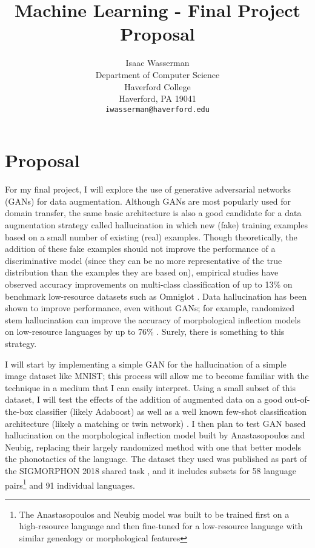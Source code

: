 \documentclass{article}
\title{Machine Learning - Final Project Proposal}
\author{%
  Isaac Wasserman\\
  Department of Computer Science\\
  Haverford College\\
  Haverford, PA 19041\\
  \texttt{iwasserman@haverford.edu} \\
}
\begin{document}
  \maketitle

  \section{Proposal}
  For my final project, I will explore the use of generative adversarial networks (GANs) for data augmentation. Although GANs are most popularly used for domain transfer, the same basic architecture is also a good candidate for a data augmentation strategy called hallucination in which new (fake) training examples based on a small number of existing (real) examples. Though theoretically, the addition of these fake examples should not improve the performance of a discriminative model (since they can be no more representative of the true distribution than the examples they are based on), empirical studies have observed accuracy improvements on multi-class classification of up to 13\% on benchmark low-resource datasets such as Omniglot \cite{antoniou}. Data hallucination has been shown to improve performance, even without GANs; for example, randomized stem hallucination can improve the accuracy of morphological inflection models on low-resource languages by up to 76\% \cite{anastasopoulos-neubig-2019-pushing}. Surely, there is something to this strategy.

  I will start by implementing a simple GAN for the hallucination of a simple image dataset like MNIST; this process will allow me to become familiar with the technique in a medium that I can easily interpret. Using a small subset of this dataset, I will test the effects of the addition of augmented data on a good out-of-the-box classifier (likely Adaboost) as well as a well known few-shot classification \cite{fewshot} architecture (likely a matching or twin network) \cite{matching-networks} \cite{twin-networks}. I then plan to test GAN based hallucination on the morphological inflection model built by Anastasopoulos and Neubig, replacing their largely randomized method with one that better models the phonotactics of the language. The dataset they used was published as part of the SIGMORPHON 2018 shared task \cite{sigmorphon}, and it includes subsets for 58 language pairs\footnote{The Anastasopoulos and Neubig model was built to be trained first on a high-resource language and then fine-tuned for a low-resource language with similar genealogy or morphological features} and 91 individual languages.
\end{document}
